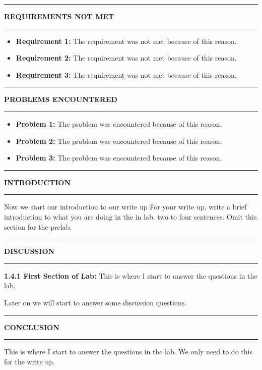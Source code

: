\documentclass{article}
\begin{document}

\begin{center}
    \hrule
    \vspace{0.2cm}
    \textbf{\large REQUIREMENTS NOT MET}
    \vspace{0.2cm}
    \hrule
\end{center}
\begin{itemize}
    \item \textbf{Requirement 1:} The requirement was not met because of this reason.
    \item \textbf{Requirement 2:} The requirement was not met because of this reason.
    \item \textbf{Requirement 3:} The requirement was not met because of this reason.
\end{itemize}

\begin{center}
    \hrule
    \vspace{0.2cm}
    \textbf{\large PROBLEMS ENCOUNTERED}
    \vspace{0.2cm}
    \hrule
\end{center}
\begin{itemize}
    \item \textbf{Problem 1:} The problem was encountered because of this reason.
    \item \textbf{Problem 2:} The problem was encountered because of this reason.
    \item \textbf{Problem 3:} The problem was encountered because of this reason.
\end{itemize}

\begin{center}
    \hrule
    \vspace{0.2cm}
    \textbf{\large INTRODUCTION}
    \vspace{0.2cm}
    \hrule
\end{center}

Now we start our introduction to our write up
For your write up, write a brief introduction to what you are doing in the in lab. two to four sentences. 
Omit this section for the prelab.


\begin{center}
    \hrule
    \vspace{0.2cm}
    \textbf{\large DISCUSSION}
    \vspace{0.2cm}
    \hrule
\end{center}

\textbf{1.4.1 First Section of Lab:}
This is where I start to answer the questions in the lab.

Later on we will start to answer some discussion questions.

\begin{center}
    \hrule
    \vspace{0.2cm}
    \textbf{\large CONCLUSION}
    \vspace{0.2cm}
    \hrule
\end{center}

This is where I start to answer the questions in the lab. We only need to do this for the write up.
\end{document}
